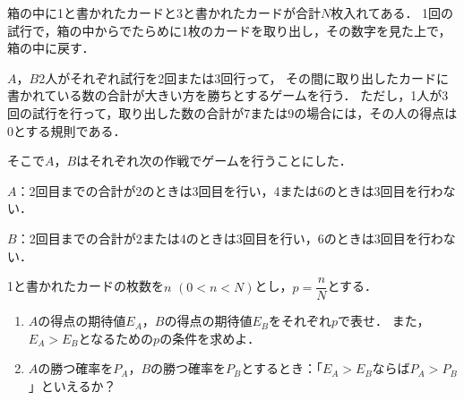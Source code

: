 \documentclass[../../main.tex]{subfiles}
\begin{document}
箱の中に1と書かれたカードと3と書かれたカードが合計$N$枚入れてある．
1回の試行で，箱の中からでたらめに1枚のカードを取り出し，その数字を見た上で，箱の中に戻す．

$A$，$B$2人がそれぞれ試行を2回または3回行って，
その間に取り出したカードに書かれている数の合計が大きい方を勝ちとするゲームを行う．
ただし，1人が3回の試行を行って，取り出した数の合計が7または9の場合には，その人の得点は0とする規則である．

そこで$A$，$B$はそれぞれ次の作戦でゲームを行うことにした．

$A$：2回目までの合計が2のときは3回目を行い，4または6のときは3回目を行わない．

$B$：2回目までの合計が2または4のときは3回目を行い，6のときは3回目を行わない．

1と書かれたカードの枚数を$n$ $(0<n<N)$とし，$\displaystyle p=\dfrac{n}{N}$とする．
\begin{enumerate}
  \item $A$の得点の期待値$E_A$，$B$の得点の期待値$E_B$をそれぞれ$p$で表せ．
    また，$E_A>E_B$となるための$p$の条件を求めよ．
  \item $A$の勝つ確率を$P_A$，$B$の勝つ確率を$P_B$とするとき：「$E_A>E_B$ならば$P_A>P_B$」といえるか？
\end{enumerate}
\end{document}
